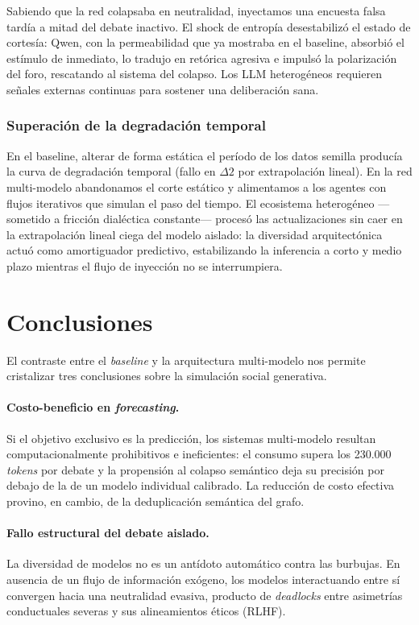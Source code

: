 \documentclass[11pt]{article}
\begin{document}
Sabiendo que la red colapsaba en neutralidad, inyectamos una encuesta falsa tardía a mitad del debate inactivo. El shock de entropía desestabilizó el estado de cortesía: Qwen, con la permeabilidad que ya mostraba en el baseline, absorbió el estímulo de inmediato, lo tradujo en retórica agresiva e impulsó la polarización del foro, rescatando al sistema del colapso. Los LLM heterogéneos requieren señales externas continuas para sostener una deliberación sana.

\subsubsection{Superación de la degradación temporal}

En el baseline, alterar de forma estática el período de los datos semilla producía la curva de degradación temporal (fallo en $\Delta 2$ por extrapolación lineal). En la red multi-modelo abandonamos el corte estático y alimentamos a los agentes con flujos iterativos que simulan el paso del tiempo. El ecosistema heterogéneo —sometido a fricción dialéctica constante— procesó las actualizaciones sin caer en la extrapolación lineal ciega del modelo aislado: la diversidad arquitectónica actuó como amortiguador predictivo, estabilizando la inferencia a corto y medio plazo mientras el flujo de inyección no se interrumpiera.

\section{Conclusiones}
\label{sec:conclusiones}
El contraste entre el \textit{baseline} y la arquitectura multi-modelo nos permite cristalizar tres conclusiones sobre la simulación social generativa.

\paragraph{Costo-beneficio en \textit{forecasting}.} Si el objetivo exclusivo es la predicción, los sistemas multi-modelo resultan computacionalmente prohibitivos e ineficientes: el consumo supera los 230.000 \textit{tokens} por debate y la propensión al colapso semántico deja su precisión por debajo de la de un modelo individual calibrado. La reducción de costo efectiva provino, en cambio, de la deduplicación semántica del grafo.

\paragraph{Fallo estructural del debate aislado.} La diversidad de modelos no es un antídoto automático contra las burbujas. En ausencia de un flujo de información exógeno, los modelos interactuando entre sí convergen hacia una neutralidad evasiva, producto de \textit{deadlocks} entre asimetrías conductuales severas y sus alineamientos éticos (RLHF).
\end{document}
